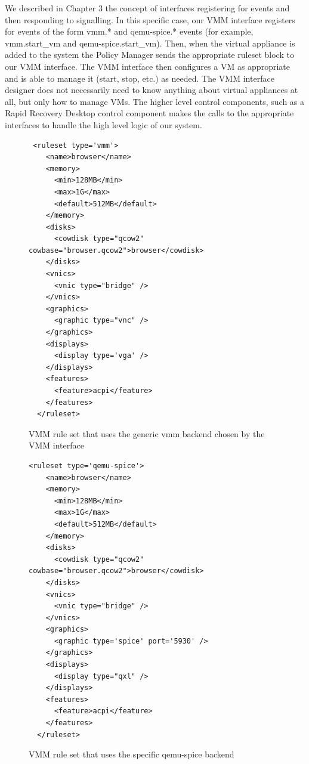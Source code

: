 We described in Chapter 3 the concept of interfaces registering for events and then responding to signalling. In this specific case, our VMM interface registers for events of the form vmm.* and qemu-spice.* events (for example, vmm.start\_vm and qemu-spice.start\_vm). Then, when the virtual appliance is added to the system the Policy Manager sends the appropriate ruleset block to our VMM interface. The VMM interface then configures a VM as appropriate and is able to manage it (start, stop, etc.) as needed. The VMM interface designer does not necessarily need to know anything about virtual appliances at all, but only how to manage VMs. The higher level control components, such as a Rapid Recovery Desktop control component makes the calls to the appropriate interfaces to handle the high level logic of our system.

\begin{figure}[tbp]
\caption{VMM rule set that uses the generic vmm backend chosen by the VMM interface}
\label{lst:generic-vmm}

\begin{lstlisting}
 <ruleset type='vmm'>
    <name>browser</name>
    <memory>
      <min>128MB</min>
      <max>1G</max>
      <default>512MB</default>
    </memory>
    <disks>
      <cowdisk type="qcow2" cowbase="browser.qcow2">browser</cowdisk>
    </disks>
    <vnics>
      <vnic type="bridge" />
    </vnics>
    <graphics>
      <graphic type="vnc" />
    </graphics>
    <displays>  
      <display type='vga' />
    </displays>
    <features>
      <feature>acpi</feature>
    </features>
  </ruleset>
\end{lstlisting}
\end{figure}

\begin{figure}[tbp]
\caption{VMM rule set that uses the specific qemu-spice backend}
\label{lst:specific-vmm}

\begin{lstlisting}
<ruleset type='qemu-spice'>
    <name>browser</name>
    <memory>
      <min>128MB</min>
      <max>1G</max>
      <default>512MB</default>
    </memory>
    <disks>
      <cowdisk type="qcow2" cowbase="browser.qcow2">browser</cowdisk>
    </disks>
    <vnics>
      <vnic type="bridge" />
    </vnics>
    <graphics>
      <graphic type='spice' port='5930' />
    </graphics>
    <displays>  
      <display type="qxl" />
    </displays>
    <features>
      <feature>acpi</feature>
    </features>
  </ruleset>
\end{lstlisting}
\end{figure}

